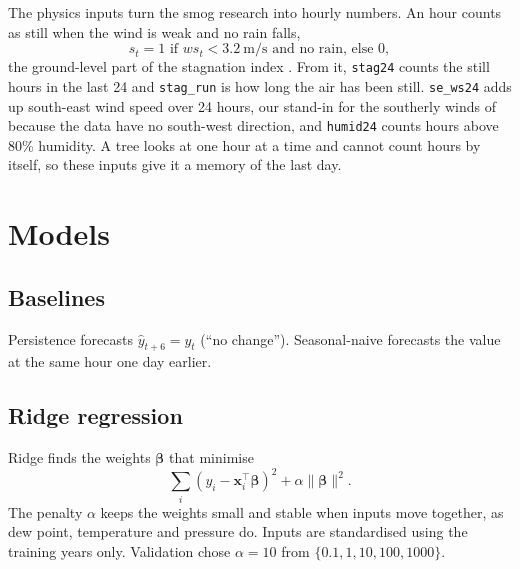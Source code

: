 \documentclass[conference]{IEEEtran}
\newcommand{\col}[1]{\texttt{#1}}
\begin{document}
The physics inputs turn the smog research into hourly numbers. An hour counts as still when the wind is weak and no rain falls,
\begin{equation}
s_t = 1 \text{ if } ws_t < 3.2\ \text{m/s and no rain, else } 0,
\end{equation}
the ground-level part of the stagnation index \cite{huang2018}. From it, \col{stag24} counts the still hours in the last 24 and \col{stag\_run} is how long the air has been still. \col{se\_ws24} adds up south-east wind speed over 24 hours, our stand-in for the southerly winds of \cite{zhong2018} because the data have no south-west direction, and \col{humid24} counts hours above 80\% humidity. A tree looks at one hour at a time and cannot count hours by itself, so these inputs give it a memory of the last day.

\section{Models}
\label{sec:models}

\subsection{Baselines}
Persistence forecasts $\hat{y}_{t+6} = y_t$ (``no change''). Seasonal-naive forecasts the value at the same hour one day earlier.

\subsection{Ridge regression}
Ridge \cite{hoerl1970} finds the weights $\boldsymbol{\beta}$ that minimise
\begin{equation}
\sum_i (y_i - \mathbf{x}_i^\top\boldsymbol{\beta})^2 + \alpha \lVert\boldsymbol{\beta}\rVert^2 .
\end{equation}
The penalty $\alpha$ keeps the weights small and stable when inputs move together, as dew point, temperature and pressure do. Inputs are standardised using the training years only. Validation chose $\alpha = 10$ from $\{0.1, 1, 10, 100, 1000\}$.
\end{document}

